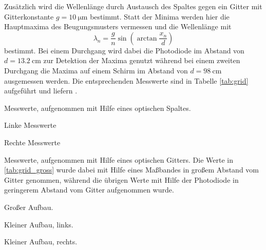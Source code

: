 Zusätzlich wird die Wellenlänge durch Austausch des Spaltes gegen ein Gitter mit Gitterkonstante $g = \SI{10}{\micro\meter}$ bestimmt.
Statt der Minima werden hier die Hauptmaxima des Beugungsmusters vermessen und die Wellenlänge mit
\begin{equation}
\label{eq:gitter}
    \lambda_n = \frac{g}{n}\sin\!\left(\arctan\frac{x_n}{d}\right)
\end{equation}
bestimmt.
Bei einem Durchgang wird dabei die Photodiode im Abstand von $d = \SI{13.2}{\centi\meter}$ zur Detektion der Maxima genutzt während bei einem zweiten Durchgang die Maxima auf einem Schirm im Abstand von $d = \SI{98}{\centi\meter}$ ausgemessen werden.
Die entsprechenden Messwerte sind in Tabelle \ref{tab:grid} aufgeführt und liefern \unskip.
\begin{table}
    \centering
    \caption{Messwerte, aufgenommen mit Hilfe eines optischen Spaltes.}
    \label{tab:spalt}
    \begin{subtable}{0.49\linewidth}
        \centering
        \caption{Linke Messwerte}
        \label{tab:spalt_links}
        
    \end{subtable}
    \begin{subtable}{0.49\linewidth}
        \centering
        \caption{Rechte Messwerte}
        \label{tab:spalt_rechts}
        
    \end{subtable}
\end{table}
\begin{table}
    \centering
    \caption{
        Messwerte, aufgenommen mit Hilfe eines optischen Gitters.
        Die Werte in \ref{tab:grid_gross} wurde dabei mit Hilfe eines
        Maßbandes in großem Abstand vom Gitter genommen, während die übrigen
        Werte mit Hilfe der Photodiode in geringerem Abstand vom Gitter
        aufgenommen wurde.
    }
    \label{tab:grid}
    \begin{subtable}[t]{0.32\linewidth}
        \centering
        \caption{Großer Aufbau.}
        \label{tab:grid_gross}
        
    \end{subtable}
    \begin{subtable}[t]{0.32\linewidth}
        \centering
        \caption{Kleiner Aufbau, links.}
        \label{tab:grid_links}
        
    \end{subtable}
    \begin{subtable}[t]{0.32\linewidth}
        \centering
        \caption{Kleiner Aufbau, rechts.}
        \label{tab:grid_rechts}
        
    \end{subtable}
\end{table}

